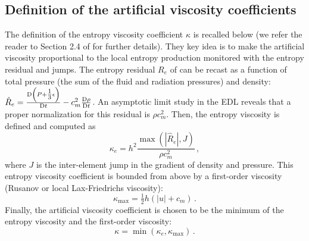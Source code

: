 \documentclass[times,doublespace]{fldauth}%
\begin{document}
\subsection{Definition of the artificial viscosity coefficients}\label{sec:visc-coeff-def}
%
The definition of the  entropy viscosity coefficient $\kappa$ is recalled below (we refer the reader to Section 2.4 of \cite{our_jcp_radhy_paper} for further details). They key idea is to make the artificial viscosity proportional to the 
local entropy production monitored with the entropy residual and jumps. The entropy residual $R_e$ of  can be recast
as a function of total pressure (the sum of the fluid and radiation pressures) and density: $\hat R_e = \frac{\textrm{D} \left(P+\tfrac 1 3 \epsilon\right)}{\textrm{D} t} - c^2_m \frac{\textrm{D} \rho}{\textrm{D} t}$. An asymptotic limit study in the EDL reveals that a proper normalization for this residual is $\rho c^2_m$. Then, the entropy viscosity is defined and computed as
\begin{equation}\label{eq:visc-def}
\kappa_e = h^2 \frac{\max \left( |\hat R_e|, J \right)}{\rho c^2_m} \, ,
\end{equation}
where $J$ is the inter-element jump in the gradient of density and pressure.
This entropy viscosity coefficient is bounded from above by a first-order viscosity (Rusanov or local Lax-Friedrichs viscosity):
\begin{equation}
\kappa_\text{max} = \tfrac 1 2 h \left( |u| + c_m \right) \nonumber \,.
\end{equation}
Finally, the artificial viscosity coefficient is chosen to be the minimum of the entropy viscosity and the first-order viscosity:
\begin{equation}
\kappa = \min \left( \kappa_e, \kappa_\text{max} \right) \nonumber \,.
\end{equation}
%
\end{document}
